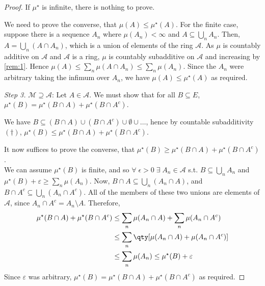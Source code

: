 \begin{proof}
	If $\mu^\star$ is infinite, there is nothing to prove.

	We need to prove the converse, that $\mu(A) \leq \mu^\star(A)$.
	For the finite case, suppose there is a sequence $A_n$ where $\mu(A_n) < \infty$ and $A \subseteq \bigcup_n A_n$.
	Then, $A = \bigcup_n (A \cap A_n)$, which is a union of elements of the ring $\mathcal A$.
	As $\mu$ is countably additive on $\mathcal{A}$ and $\mathcal{A}$ is a ring, $\mu$ is countably subadditive on $\mathcal{A}$ and increasing by \cref{rem:1}.
	Hence $\mu(A) \leq \sum_n \mu(A \cap A_n) \leq \sum_n \mu(A_n)$.
	Since the $A_n$ were arbitrary taking the infimum over $A_n$, we have $\mu(A) \leq \mu^\star(A)$ as required.

	\emph{Step 3.} $\mathcal M \supseteq \mathcal A$:
	Let $A \in \mathcal A$.
	We must show that for all $B \subseteq E$, $\mu^\star(B) = \mu^\star(B \cap A) + \mu^\star(B \cap A^c)$.

	We have $B \subseteq (B \cap A) \cup (B \cap A^c) \cup \emptyset \cup \dots$, hence by countable subadditivity $(\dagger)$, $\mu^\star(B) \leq \mu^\star(B \cap A) + \mu^\star(B \cap A^c)$.

	It now suffices to prove the converse, that $\mu^\star(B) \geq \mu^\star(B \cap A) + \mu^\star(B \cap A^c)$. \\
	We can assume $\mu^\star(B)$ is finite, and so $\forall \; \epsilon > 0 \; \exists \; A_n \in \mathcal A$ s.t. $B \subseteq \bigcup_n A_n$ and $\mu^\star(B) + \varepsilon \geq \sum_n \mu(A_n)$.
	Now, $B \cap A \subseteq \bigcup_n (A_n \cap A)$, and $B \cap A^c \subseteq \bigcup_n (A_n \cap A^c)$.
	All of the members of these two unions are elements of $\mathcal A$, since $A_n \cap A^c = A_n \setminus A$.
	Therefore,
	\begin{align*}
		\mu^\star(B \cap A) + \mu^\star(B \cap A^c) &\leq \sum_n \mu(A_n \cap A) + \sum_n \mu(A_n \cap A^c) \\
		&\leq \sum_n \qty[ \mu(A_n \cap A) + \mu(A_n \cap A^c) ] \\
		&\leq \sum_n \mu(A_n) \leq \mu^\star(B) + \varepsilon
	\end{align*}
	Since $\varepsilon$ was arbitrary, $\mu^\star(B) = \mu^\star(B \cap A) + \mu^\star(B \cap A^c)$ as required.


\end{proof}
